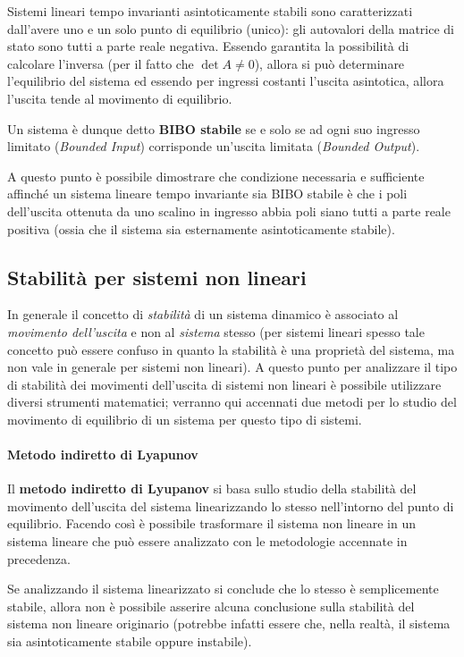 		Sistemi lineari tempo invarianti asintoticamente stabili sono caratterizzati dall'avere uno e un solo punto di equilibrio (unico): gli autovalori della matrice di stato sono tutti a parte reale negativa. Essendo garantita la possibilità di calcolare l'inversa (per il fatto che $\det A \neq 0$), allora si può determinare l'equilibrio del sistema ed essendo per ingressi costanti l'uscita asintotica, allora l'uscita tende al movimento di equilibrio.
		
		\begin{concetto}
			Un sistema è dunque detto \textbf{BIBO stabile} se e solo se ad ogni suo ingresso limitato (\textit{Bounded Input}) corrisponde un'uscita limitata (\textit{Bounded Output}).
		\end{concetto}
		A questo punto è possibile dimostrare che condizione necessaria e sufficiente affinché un sistema lineare tempo invariante sia BIBO stabile è che i poli dell'uscita ottenuta da uno scalino in ingresso abbia poli siano tutti a parte reale positiva (ossia che il sistema sia esternamente asintoticamente stabile).
		
	\subsection{Stabilità per sistemi non lineari}
		In generale il concetto di \textit{stabilità} di un sistema dinamico è associato al \textit{movimento dell'uscita} e non al \textit{sistema} stesso (per sistemi lineari spesso tale concetto può essere confuso in quanto la stabilità è una proprietà del sistema, ma non vale in generale per sistemi non lineari). A questo punto per analizzare il tipo di stabilità dei movimenti dell'uscita di sistemi non lineari è possibile utilizzare diversi strumenti matematici; verranno qui accennati due metodi per lo studio del movimento di equilibrio di un sistema per questo tipo di sistemi.
		
		\paragraph{Metodo indiretto di Lyapunov} Il \textbf{metodo indiretto di Lyupanov} si basa sullo studio della stabilità del movimento dell'uscita del sistema linearizzando lo stesso nell'intorno del punto di equilibrio. Facendo così è possibile trasformare il sistema non lineare in un sistema lineare che può essere analizzato con le metodologie accennate in precedenza.
		
		Se analizzando il sistema linearizzato si conclude che lo stesso è semplicemente stabile, allora non è possibile asserire alcuna conclusione sulla stabilità del sistema non lineare originario (potrebbe infatti essere che, nella realtà, il sistema sia asintoticamente stabile oppure instabile).
		
